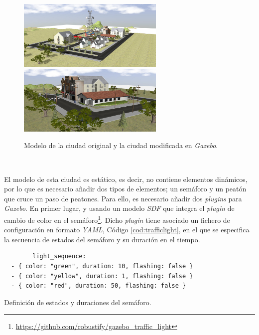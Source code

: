\begin{figure} [h!]
	\begin{center}
		\includegraphics[width=7cm]{figs/city2}\hspace{1cm}\includegraphics[width=7cm]{figs/smallcity}
	\end{center}
	\caption{Modelo de la ciudad original y la ciudad modificada en \textit{Gazebo}.}
	\label{fig:city}
\end{figure}\

El modelo de esta ciudad es estático, es decir, no contiene elementos dinámicos, por lo que es necesario añadir dos tipos de elementos; un semáforo y un peatón que cruce un paso
de peatones. Para ello, es necesario añadir dos \textit{plugins} para \textit{Gazebo}. En primer lugar, y usando un modelo \textit{SDF} que integra el \textit{plugin} de cambio de
color en el semáforo\footnote{\url{https://github.com/robustify/gazebo_traffic_light}}. Dicho \textit{plugin} tiene asociado un fichero de configuración en formato \textit{YAML},
Código \ref{cod:trafficlight}, en el que se especifica la secuencia de estados del semáforo y su duración en el tiempo.\\

\begin{code}[h]
	\begin{lstlisting}
		light_sequence:
  - { color: "green", duration: 10, flashing: false }
  - { color: "yellow", duration: 1, flashing: false }
  - { color: "red", duration: 50, flashing: false }
	\end{lstlisting}
	\caption[Definición de estados y duraciones del semáforo.]{Definición de estados y duraciones del semáforo.}
	\label{cod:trafficlight}
\end{code}


